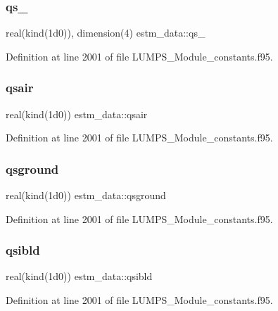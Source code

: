 \subsubsection{\texorpdfstring{qs\+\_}{qs\_4}}
{\footnotesize\ttfamily real(kind(1d0)), dimension(4) estm\+\_\+data\+::qs\+\_}



Definition at line 2001 of file L\+U\+M\+P\+S\+\_\+\+Module\+\_\+constants.\+f95.

\mbox{\label{namespaceestm__data_ae795d432550126e53ae2b5d23aa201ee}} 
\subsubsection{\texorpdfstring{qsair}{qsair}}
{\footnotesize\ttfamily real(kind(1d0)) estm\+\_\+data\+::qsair}



Definition at line 2001 of file L\+U\+M\+P\+S\+\_\+\+Module\+\_\+constants.\+f95.

\mbox{\label{namespaceestm__data_ab1d9bb697a8d9aa36c61f312c561e7f4}} 
\subsubsection{\texorpdfstring{qsground}{qsground}}
{\footnotesize\ttfamily real(kind(1d0)) estm\+\_\+data\+::qsground}



Definition at line 2001 of file L\+U\+M\+P\+S\+\_\+\+Module\+\_\+constants.\+f95.

\mbox{\label{namespaceestm__data_a8ff592c60b4e732443fd36c877a550bf}} 
\subsubsection{\texorpdfstring{qsibld}{qsibld}}
{\footnotesize\ttfamily real(kind(1d0)) estm\+\_\+data\+::qsibld}



Definition at line 2001 of file L\+U\+M\+P\+S\+\_\+\+Module\+\_\+constants.\+f95.

